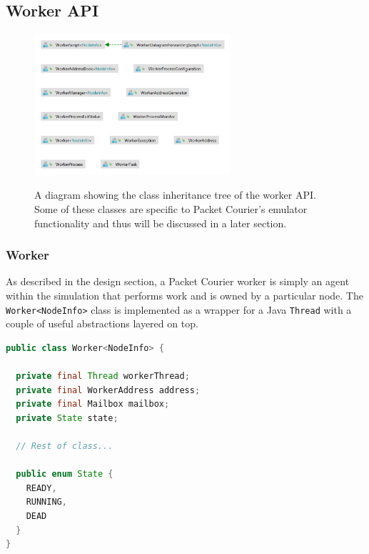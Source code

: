 \subsection{Worker API}\label{subsection:worker_api}

\begin{figure}[!h]
    \includegraphics[width=0.65\textwidth]{images/chapter_4_implementation/worker_api_tree}
    \centering~\caption{A diagram showing the class inheritance tree of the worker API. Some of these classes are
    specific to Packet Courier's emulator functionality and thus will be discussed in a later section.}
    \label{fig:chapter_4_implementation-worker_api_tree}
\end{figure}

\subsubsection{Worker}\label{subsubsection:worker}

As described in the design section, a Packet Courier worker is simply an agent within the simulation that performs
work and is owned by a particular node. The \texttt{Worker<NodeInfo>} class is implemented as a wrapper for a Java
\texttt{Thread}\cite{java_Thread} with a couple of useful abstractions layered on top.
\begin{lstlisting}[language=Java,caption={A cut-down version of the \texttt{Worker<NodeInfo>} class.},
    label={code:worker_class},captionpos=b]
public class Worker<NodeInfo> {

  private final Thread workerThread;
  private final WorkerAddress address;
  private final Mailbox mailbox;
  private State state;

  // Rest of class...

  public enum State {
    READY,
    RUNNING,
    DEAD
  }
}
\end{lstlisting}

